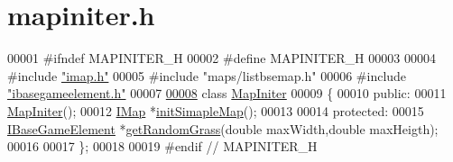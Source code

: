 \hypertarget{a00098_source}{}\section{mapiniter.\+h}
\label{a00098_source}

\begin{DoxyCode}
00001 \textcolor{preprocessor}{#}\textcolor{preprocessor}{ifndef} \textcolor{preprocessor}{MAPINITER\_H}
00002 \textcolor{preprocessor}{#}\textcolor{preprocessor}{define} \textcolor{preprocessor}{MAPINITER\_H}
00003 
00004 \textcolor{preprocessor}{#}\textcolor{preprocessor}{include} \hyperlink{a00053}{"imap.h"}
00005 \textcolor{preprocessor}{#}\textcolor{preprocessor}{include} \textcolor{preprocessor}{"maps/listbsemap.h"}
00006 \textcolor{preprocessor}{#}\textcolor{preprocessor}{include} \hyperlink{a00047}{"ibasegameelement.h"}
00007 
\hyperlink{a00217}{00008} \textcolor{keyword}{class} \hyperlink{a00217}{MapIniter}
00009 \{
00010 \textcolor{keyword}{public}:
00011     \hyperlink{a00217_a1137dec968988621ea18091fdf379987}{MapIniter}();
00012     \hyperlink{a00165}{IMap} *\hyperlink{a00217_ae6dfbed9cc8569db78442c0bfe57e252}{initSimapleMap}();
00013 
00014 \textcolor{keyword}{protected}:
00015     \hyperlink{a00137_ae2be75da1a2a9edfabe993770e24654a}{IBaseGameElement} *\hyperlink{a00217_a8961b80aa1df5f628bd4e28e66a51d0b}{getRandomGrass}(\textcolor{keywordtype}{double} maxWidth,\textcolor{keywordtype}{double} maxHeigth);
00016 
00017 \};
00018 
00019 \textcolor{preprocessor}{#}\textcolor{preprocessor}{endif} \textcolor{comment}{// MAPINITER\_H}
\end{DoxyCode}
